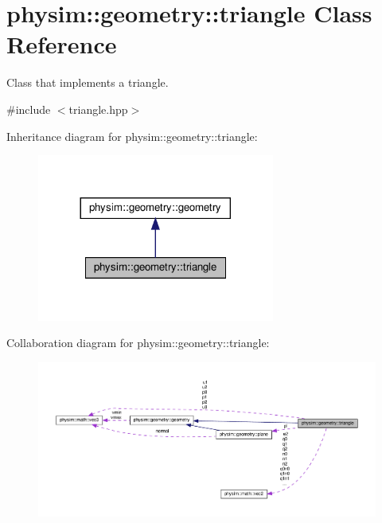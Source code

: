 \hypertarget{classphysim_1_1geometry_1_1triangle}{}\section{physim\+:\+:geometry\+:\+:triangle Class Reference}
\label{classphysim_1_1geometry_1_1triangle}


Class that implements a triangle.  




{\ttfamily \#include $<$triangle.\+hpp$>$}



Inheritance diagram for physim\+:\+:geometry\+:\+:triangle\+:\nopagebreak
\begin{figure}[H]
\begin{center}
\leavevmode
\includegraphics[width=221pt]{classphysim_1_1geometry_1_1triangle__inherit__graph}
\end{center}
\end{figure}


Collaboration diagram for physim\+:\+:geometry\+:\+:triangle\+:
\nopagebreak
\begin{figure}[H]
\begin{center}
\leavevmode
\includegraphics[width=350pt]{classphysim_1_1geometry_1_1triangle__coll__graph}
\end{center}
\end{figure}
